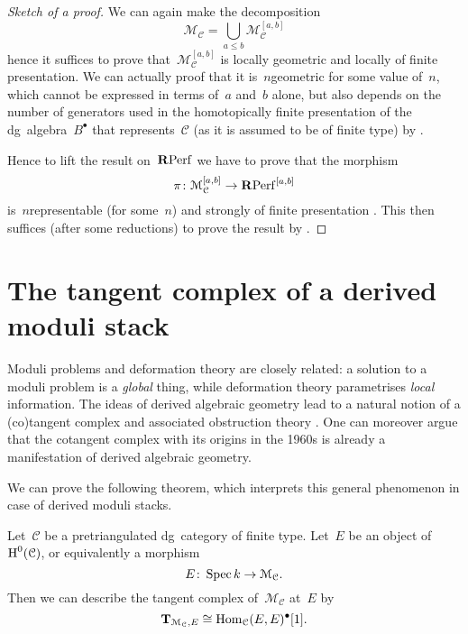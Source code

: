 \begin{refsection}
\begin{theorem}
  \begin{proof}[Sketch of a proof]
    We can again make the decomposition
    \begin{equation}
      \mathcal{M}_{\mathcal{C}}=\bigcup_{a\leq b}\mathcal{M}_{\mathcal{C}}^{[a,b]}
    \end{equation}
    hence it suffices to prove that~$\mathcal{M}_{\mathcal{C}}^{[a,b]}$ is locally geometric and locally of finite presentation. We can actually proof that it is~$n$\dash geometric for some value of~$n$, which cannot be expressed in terms of~$a$ and~$b$ alone, but also depends on the number of generators used in the homotopically finite presentation of the dg~algebra~$B^\bullet$ that represents~$\mathcal{C}$ (as it is assumed to be of finite type) by \cite[corollary 2.12]{toen-vaquie}.

    Hence to lift the result on~$\mathbf{R}\mathrm{Perf}$ we have to prove that the morphism
    \begin{equation}
      \pi\colon\mathcal{M}_{\mathcal{C}}^{[a,b]}\to\mathbf{R}\mathrm{Perf}^{[a,b]}
    \end{equation}
    is~$n$\dash representable (for some~$n$) and strongly of finite presentation \cite[lemma 2.20]{toen-vaquie}. This then suffices (after some reductions) to prove the result by \cite[lemma 2.15]{toen-vaquie}.
  \end{proof}
\end{theorem}


\section{The tangent complex of a derived moduli stack}
Moduli problems and deformation theory are closely related: a solution to a moduli problem is a \emph{global} thing, while deformation theory parametrises \emph{local} information. The ideas of derived algebraic geometry lead to a natural notion of a (co)tangent complex and associated obstruction theory \cite[section 2.2]{hagII}. One can moreover argue that the cotangent complex with its origins in the 1960s is already a manifestation of derived algebraic geometry.

We can prove the following theorem, which interprets this general phenomenon in case of derived moduli stacks.
\begin{theorem}
  Let~$\mathcal{C}$ be a pretriangulated dg~category of finite type. Let~$E$ be an object of~$\operatorname{H}^0(\mathcal{C})$, or equivalently a morphism
  \begin{equation}
    E\colon\operatorname{Spec} k\to\mathcal{M}_{\mathcal{C}}.
  \end{equation}
  Then we can describe the tangent complex of~$\mathcal{M}_{\mathcal{C}}$ at~$E$ by
  \begin{equation}
    \mathbf{T}_{\mathcal{M}_{\mathcal{C}},E}\cong\mathrm{Hom}_{\mathcal{C}}(E,E)^\bullet[1].
  \end{equation}
\end{theorem}


\end{refsection}

